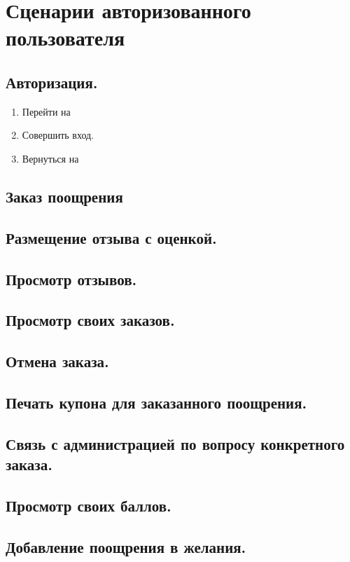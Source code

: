      \section{Сценарии авторизованного пользователя}

        \subsection{Авторизация.}
            \begin{enumerate}
                \item Перейти на  
                \item Совершить вход.
                \item Вернуться на 
            \end{enumerate}
            
        \subsection{Заказ поощрения}
        \subsection{Размещение отзыва с оценкой.}
        \subsection{Просмотр отзывов.}
        \subsection{Просмотр своих заказов.}
        \subsection{Отмена заказа.}
        \subsection{Печать купона для заказанного поощрения.}
        \subsection{Связь с администрацией по вопросу конкретного заказа.}
        \subsection{Просмотр своих баллов.}
        \subsection{Добавление поощрения в желания.}
